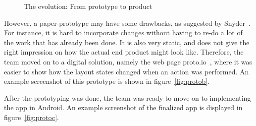 \begin{figure}[H]
  \centering
\quad
\quad
\caption{The evolution: From prototype to product}
\end{figure}

\noindent However, a paper-prototype may have some drawbacks, as suggested by Snyder~\cite{paperprototype}. For instance, it is hard to incorporate changes without having to re-do a lot of the work that has already been done. It is also very static, and does not give the right impression on how the actual end product might look like. Therefore, the team moved on to a digital solution, namely the web page proto.io~\cite{protoio}, where it was easier to show how the layout states changed when an action was performed. An example screenshot of this prototype is shown in figure~\ref{fig:protob}.

After the prototyping was done, the team was ready to move on to implementing the app in Android. An example screenshot of the finalized app is displayed in figure~\ref{fig:protoc}.
